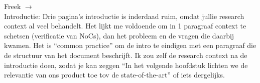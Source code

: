 \begin{tcolorbox}[colback=yellow!30]

Freek $\rightarrow$ \\ 
Introductie: Drie pagina's introductie is inderdaad ruim, omdat jullie research context al veel behandelt. Het lijkt me voldoende om in 1 paragraaf context te schetsen (verificatie van NoCs), dan het probleem en de vragen die daarbij kwamen. Het is ``common practice'' om de intro te eindigen met een paragraaf die de structuur van het document beschrijft. Ik zou zelf de research context na de introductie doen, zodat je kan zeggen ``In het volgende hoofdstuk lichten we de relevantie van ons product toe tov de state-of-the-art'' of iets dergelijks.

\end{tcolorbox}


